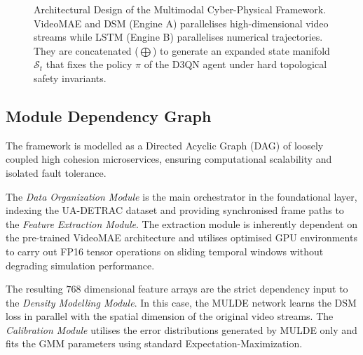 \documentclass[conference]{IEEEtran}
\begin{document}
\begin{figure}[htbp]
{
}
\caption{Architectural Design of the Multimodal Cyber-Physical Framework. VideoMAE and DSM (Engine A) parallelises high-dimensional video streams while LSTM (Engine B) parallelises numerical trajectories. They are concatenated ($\bigoplus$) to generate an expanded state manifold $\mathcal{S}_t$ that fixes the policy $\pi$ of the D3QN agent under hard topological safety invariants.}
\label{fig:full_architecture}
\end{figure}

\subsection{Module Dependency Graph}
The framework is modelled as a Directed Acyclic Graph (DAG) of loosely coupled high cohesion microservices, ensuring computational scalability and isolated fault tolerance. 

The \textit{Data Organization Module} is the main orchestrator in the foundational layer, indexing the UA-DETRAC dataset and providing synchronised frame paths to the \textit{Feature Extraction Module}. The extraction module is inherently dependent on the pre-trained VideoMAE architecture and utilises optimised GPU environments to carry out FP16 tensor operations on sliding temporal windows without degrading simulation performance.

The resulting $768$ dimensional feature arrays are the strict dependency input to the \textit{Density Modelling Module}. In this case, the MULDE network learns the DSM loss in parallel with the spatial dimension of the original video streams. The \textit{Calibration Module} utilises the error distributions generated by MULDE only and fits the GMM parameters using standard Expectation-Maximization.
\end{document}
